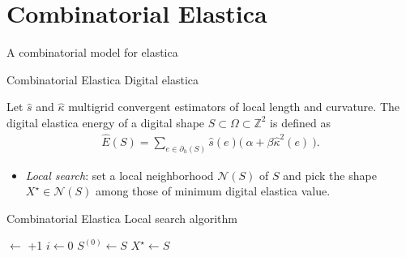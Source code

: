 \section{Combinatorial Elastica}

\begin{frame}
\begin{center}
\huge
A combinatorial model for elastica
\end{center}
\end{frame}

\begin{frame}
	{Combinatorial Elastica}	
	{Digital elastica}
%	
		\begin{definition}
		Let $\hat{s}$ and $\hat{\kappa}$ multigrid convergent estimators of local length and curvature. The digital elastica energy of a digital shape $S \subset \Omega \subset \mathbb{Z}^2$ is defined as
%		
		\begin{align*}
			\hat{E}(S) = \sum_{e \in \partial_h(S)}{\hat{s}(e) \Big(\: \alpha + \beta \hat{\kappa}^2(e) \: \Big). }
		\end{align*}
	\end{definition}
%	
	\begin{itemize}
		\item<2->{\emph{Local search}: set a local neighborhood $\mathcal{N}(S)$ of $S$ and pick the shape $X^{\star} \in \mathcal{N}(S)$ among those of minimum digital elastica value.}
	\end{itemize}
\end{frame}

\begin{frame}
	{Combinatorial Elastica}	
	{Local search algorithm}

\begin{algorithm}[H]
 
 \BlankLine
 \Delta $\longleftarrow$ \Tol+1\;
 $i \longleftarrow 0$\;
 $S^{(0)} \longleftarrow S$\;
 $X^\star \longleftarrow S$\;
\end{algorithm}
\end{frame}

